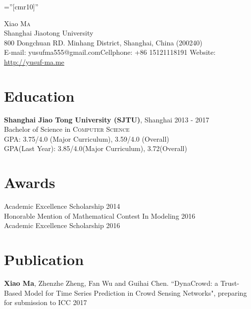 \documentclass[a4paper,10pt]{article}
\begin{document}
\begin{CJK}{GBK}{song}

\pagestyle{empty} %

\font\fb=''[cmr10]'' %

\par{\centering
	{\Huge Xiao \textsc{Ma}\\
		\vspace{5mm}
		{\normalsize	Shanghai Jiaotong University\\
			\normalsize 800 Dongchuan RD. Minhang District, Shanghai, China (200240)\\
			\normalsize E-mail: yusufma555@gmail.com\quad\quad Cellphone: +86 15121118191 \quad\quad Website: \url{http://yusuf-ma.me}}
	}\bigskip\par}



\section{Education}
\textbf{Shanghai Jiao Tong University (SJTU)}, Shanghai  \hfill  2013 - 2017\\
Bachelor of Science in \textsc{Computer Science} \\
GPA: 3.75/4.0 (Major Curriculum), 3.59/4.0 (Overall)\\
GPA(Last Year): 3.85/4.0(Major Curriculum), 3.72(Overall)

\section{Awards}
Academic Excellence Scholarship \hfill 2014 \\
Honorable Mention of Mathematical Contest In Modeling \hfill 2016\\
Academic Excellence Scholarship \hfill 2016

\section{Publication}
\textbf{Xiao Ma}, Zhenzhe Zheng, Fan Wu and Guihai Chen. ``DynaCrowd: a Trust-Based Model for Time Series Prediction in Crowd Sensing Networks", preparing for submission to ICC 2017


\end{CJK}
\end{document}
